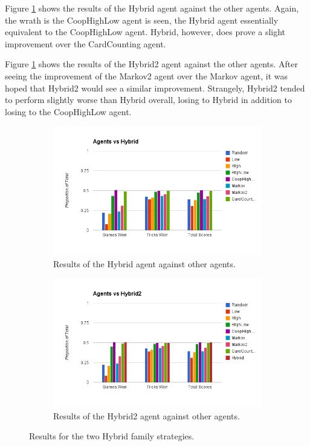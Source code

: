 Figure \ref{fig:results_hybrid} shows the results of the Hybrid agent against the other agents. Again, the wrath is the CoopHighLow agent
is seen, the Hybrid agent essentially equivalent to the CoopHighLow agent. Hybrid, however, does prove a slight improvement over the CardCounting
agent.

Figure \ref{fig:results_hybrid} shows the results of the Hybrid2 agent against the other agents. After seeing the improvement of the Markov2
agent over the Markov agent, it was hoped that Hybrid2 would see a similar improvement. Strangely, Hybrid2 tended to perform slightly worse than
Hybrid overall, losing to Hybrid in addition to losing to the CoopHighLow agent.

\begin{figure}[ht]
    \begin{subfigure}[b]{0.5\textwidth}
        \centering
        \includegraphics[width=\textwidth]{data/hybrid.png}
    \caption{Results of the Hybrid agent against other agents.}
    \label{fig:results_hybrid}
    \end{subfigure}
    \begin{subfigure}[b]{0.5\textwidth}
        \centering
        \includegraphics[width=\textwidth]{data/hybrid2.png}
    \caption{Results of the Hybrid2 agent against other agents.}
    \label{fig:results_hybrid2}
    \end{subfigure}
    \caption{Results for the two Hybrid family strategies.}
\end{figure}



